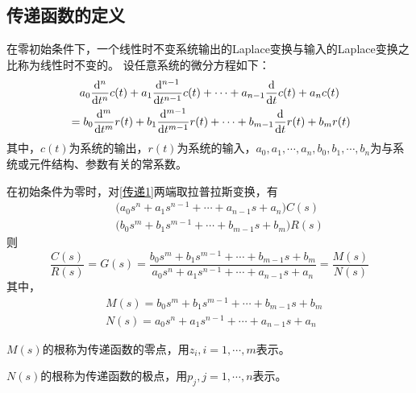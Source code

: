 \subsection{传递函数的定义}
\tdefination[传递函数]
在零初始条件下，一个线性时不变系统输出的Laplace变换与输入的Laplace变换之比称为线性时不变的。
\warn[
零初始条件
{
\begin{myitemize}
	\item 输入作用是在$t=0$之后才加于系统的，因此输入量及其各阶导数，在$t=0$时的值等于零。\vspace*{-0.5em}
	\item 输入信号作用于系统前是静止的，即$t=0$时，系统的输出量及各阶导数为零。\vspace*{0.3em}
\end{myitemize}
}
]
设任意系统的微分方程如下：
\begin{equation}
	\begin{split}
		&\quad a_0\frac{{\rm{d}}^n}{{\rm{d}} t^n}c(t) + a_1 \frac{{\rm{d}}^{n-1}}{{\rm{d}} t^{n-1}}c(t) + \cdots + a_{n-1}\frac{{\rm{d}}}{{\rm{d}} t}c(t)+a_nc(t)\\
		&=b_0\frac{{\rm{d}}^m}{{\rm{d}} t^m}r(t) + b_1 \frac{{\rm{d}}^{m-1}}{{\rm{d}} t^{m-1}}r(t) + \cdots + b_{m-1}\frac{{\rm{d}}}{{\rm{d}} t}r(t)+b_mr(t)
	\end{split}
\label{传递1}
\end{equation}
其中，$c(t)$为系统的输出，$r(t)$为系统的输入，$a_0,a_1,\cdots,a_n,b_0,b_1,\cdots,b_n$为与系统或元件结构、参数有关的常系数。

在初始条件为零时，对\eqref{传递1}两端取拉普拉斯变换，有
\begin{equation}
	\begin{split}
		&\quad \big(a_0s^n+a_1s^{n-1}+\cdots+a_{n-1}s+a_n\big)C(s)\\
		&\quad \big(b_0s^m+b_1s^{m-1}+\cdots+b_{m-1}s+b_m\big)R(s)
	\end{split}
\end{equation}
则
\begin{equation}
	\frac{C(s)}{R(s)}=G(s)=\frac{b_0s^m+b_1s^{m-1}+\cdots+b_{m-1}s+b_m}{a_0s^n+a_1s^{n-1}+\cdots+a_{n-1}s+a_n}=\frac{M(s)}{N(s)}
\end{equation}
其中，
\begin{equation*}
	\begin{split}
		&M(s) = b_0s^m+b_1s^{m-1}+\cdots+b_{m-1}s+b_m\\
		&N(s) = a_0s^n+a_1s^{n-1}+\cdots+a_{n-1}s+a_n
	\end{split}
\end{equation*}
\begin{myitemize}
	\item $M(s)$的根称为传递函数的零点，用$z_i, i =1,\cdots,m$表示。\vspace*{-0.5em}
	\item $N(s)$的根称为传递函数的极点，用$p_j, j =1, \cdots ,n$表示。\vspace*{0.3em}
\end{myitemize}

